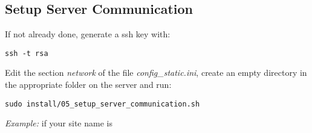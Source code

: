 \subsection{Setup Server Communication}

If not already done, generate a ssh key with:
\begin{lstlisting}
ssh -t rsa
\end{lstlisting}

Edit the section \textit{network} of the file \textit{config\_static.ini}, 
create an empty directory in the appropriate folder on the server and run: 
\begin{lstlisting}
sudo install/05_setup_server_communication.sh
\end{lstlisting}

\textit{Example:} if your site name is 









% 
